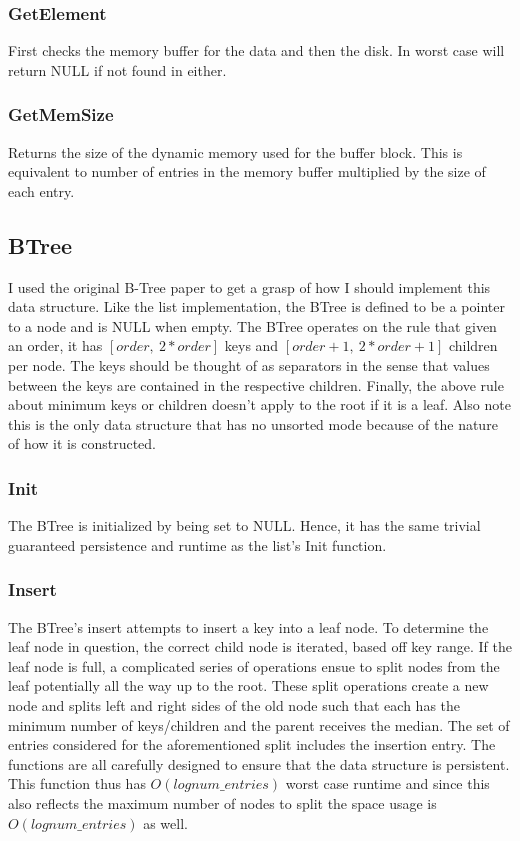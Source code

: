 \documentclass[twocolumn]{article}
\begin{document}
\subsubsection{GetElement}

First checks the memory buffer for the data and then the disk. In worst case
will return NULL if not found in either.

\subsubsection{GetMemSize}

Returns the size of the dynamic memory used for the buffer block. This is
equivalent to number of entries in the memory buffer multiplied by the size of
each entry.

\subsection{BTree}

I used the original B-Tree paper\cite{comer:computingsurveys79} to get a grasp
of how I should implement this data structure. Like the list implementation, the
BTree is defined to be a pointer to a node and is NULL when empty. The BTree
operates on the rule that given an order, it has $[order,\ 2 * order]$ keys and
$[order + 1,\ 2 * order + 1]$ children per node. The keys should be thought of as
separators in the sense that values between the keys are contained in the
respective children. Finally, the above rule about minimum keys or children
doesn't apply to the root if it is a leaf. Also note this is the only data
structure that has no unsorted mode because of the nature of how it is
constructed.

\subsubsection{Init}

The BTree is initialized by being set to NULL. Hence, it has the same trivial
guaranteed persistence and runtime as the list's Init function.

\subsubsection{Insert}

The BTree's insert attempts to insert a key into a leaf node. To determine the
leaf node in question, the correct child node is iterated, based off key range.
If the leaf node is full, a complicated series of operations ensue to split
nodes from the leaf potentially all the way up to the root. These split
operations create a new node and splits left and right sides of the old node
such that each has the minimum number of keys/children and the parent receives
the median. The set of entries considered for the aforementioned split includes
the insertion entry. The functions are all carefully designed to ensure that the
data structure is persistent. This function thus has $O(log num\_entries)$ worst
case runtime and since this also reflects the maximum number of nodes to split
the space usage is $O(log num\_entries)$ as well.
\end{document}
